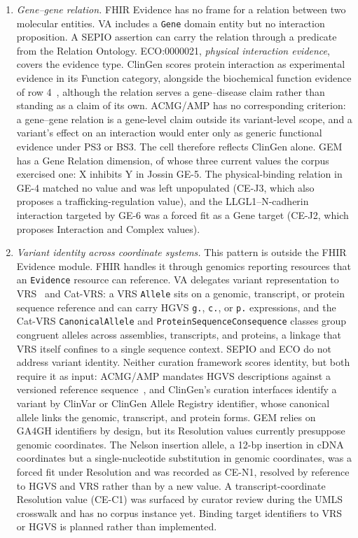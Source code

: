 \begin{enumerate}
  \item \emph{Gene--gene relation.} FHIR Evidence has no frame for a
    relation between two molecular entities. VA includes a \texttt{Gene}
    domain entity but no interaction proposition. A SEPIO assertion can
    carry the relation through a predicate from the Relation Ontology.
    ECO:0000021, \emph{physical interaction evidence}, covers the evidence
    type. ClinGen scores protein interaction as experimental evidence in
    its Function category, alongside the biochemical function evidence of
    row 4~\cite{strande2017}, although the relation serves a gene--disease
    claim rather than standing as a claim of its own. ACMG/AMP has no
    corresponding criterion: a gene--gene relation is a gene-level claim
    outside its variant-level scope, and a variant's effect on an
    interaction would enter only as generic functional evidence under PS3
    or BS3. The cell therefore reflects ClinGen alone. GEM has a Gene
    Relation dimension, of whose
    three current values the corpus exercised one: X inhibits Y in Jossin
    GE-5. The physical-binding relation in GE-4 matched no value and was
    left unpopulated (CE-J3, which also proposes a trafficking-regulation
    value), and the LLGL1--N-cadherin interaction targeted by GE-6 was a
    forced fit as a Gene target (CE-J2, which proposes Interaction and
    Complex values).

  \item \emph{Variant identity across coordinate systems.} This pattern is
    outside the FHIR Evidence module. FHIR handles it through genomics
    reporting resources that an \texttt{Evidence} resource can reference.
    VA delegates variant representation to VRS~\cite{ga4gh_vrs} and
    Cat-VRS: a VRS \texttt{Allele} sits on a genomic, transcript, or protein
    sequence reference and can carry HGVS \texttt{g.}, \texttt{c.}, or
    \texttt{p.} expressions, and the Cat-VRS \texttt{CanonicalAllele} and
    \texttt{ProteinSequenceConsequence} classes group congruent alleles
    across assemblies, transcripts, and proteins, a linkage that VRS itself
    confines to a single sequence context. SEPIO and ECO do not address
    variant identity. Neither curation framework scores identity, but both
    require it as input: ACMG/AMP mandates HGVS descriptions against a
    versioned reference sequence~\cite{acmg2015}, and ClinGen's curation
    interfaces identify a variant by ClinVar or ClinGen Allele Registry
    identifier, whose canonical allele links the genomic, transcript, and
    protein forms. GEM relies on GA4GH identifiers by design, but its
    Resolution values currently presuppose genomic coordinates. The Nelson
    insertion allele, a 12-bp insertion in cDNA coordinates but a
    single-nucleotide substitution in genomic coordinates, was a forced fit
    under Resolution  and was recorded as CE-N1, resolved by
    reference to HGVS and VRS rather than by a new value. A
    transcript-coordinate Resolution value (CE-C1) was surfaced by curator
    review during the UMLS crosswalk and has no corpus instance yet.
    Binding target identifiers to VRS or HGVS is planned rather than
    implemented.


\end{enumerate}
